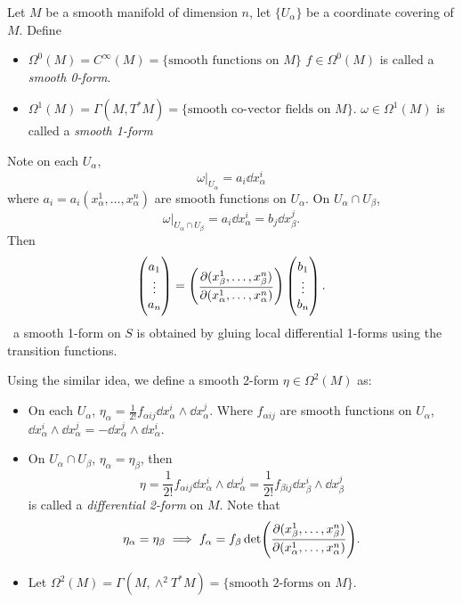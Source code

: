 Let \(M\) be a smooth manifold of dimension \(n\), let \(\{U_\alpha\}\) be a coordinate covering of \(M\). Define
\begin{itemize}
\item \(\Omega^0(M)=C^\infty(M)=\{\text{smooth functions on }M\}\)
    \(f\in \Omega^0(M)\) is called a \emph{smooth 0-form}.
\item \(\Omega^1(M)=\Gamma(M,T^*M)=\{\text{smooth co-vector fields on }M\}\).
    \(\omega\in \Omega^1(M)\) is called a \emph{smooth 1-form}
\end{itemize}

Note on each \(U_\alpha\), \[
    \omega\big|_{U_\alpha}=a_i\dd{x_\alpha^i}
\] where \(a_i=a_i(x_\alpha^1,\ldots,x_\alpha^n)\) are smooth functions on
\(U_\alpha\). On \(U_\alpha\cap U_\beta\), \[
    \omega\big|_{U_\alpha\cap U_\beta}=a_i\dd{x_\alpha^i}=b_j\dd{x_\beta^j}
.\] Then \[
    \begin{pmatrix}
        a_1 \\ \vdots \\ a_n
    \end{pmatrix}=\begin{pmatrix}
        \displaystyle\pdv{(x_\beta^1,\ldots,x_\beta^n)}{(x_\alpha^1,\ldots,x_\alpha^n)}
    \end{pmatrix}\begin{pmatrix}
        b_1 \\ \vdots \\ b_n
    \end{pmatrix}
.\] \ie\ a smooth 1-form on \(S\) is obtained by gluing local differential 1-forms
using the transition functions.

Using the similar idea, we define a smooth 2-form \(\eta\in \Omega^2(M)\) as:
\begin{itemize}
\item On each \(U_\alpha\), \(\eta_\alpha=\frac{1}{2!}f_{\alpha ij}\dd{x_\alpha^i}
    \wedge \dd{x_\alpha^j}\). Where \(f_{\alpha ij}\) are smooth functions on
    \(U_\alpha\), \(\dd{x_\alpha^i}\wedge \dd{x_\alpha^j}=-\dd{x_\alpha^j}\wedge 
    \dd{x_\alpha^i}\).
\item On \(U_\alpha\cap U_\beta\), \(\eta_\alpha=\eta_\beta\), then \[
        \eta=\frac{1}{2!}f_{\alpha ij}\dd{x_\alpha^i}\wedge \dd{x_\alpha^j}
        =\frac{1}{2!}f_{\beta ij}\dd{x_\beta^i}\wedge \dd{x_\beta^j}
    \] is called a \emph{differential 2-form} on \(M\). Note that \[
        \eta_\alpha=\eta_\beta\implies 
        f_\alpha=f_\beta \det(\pdv{(x_\beta^1,\ldots,x_\beta^n)}
        {(x_\alpha^1,\ldots,x_\alpha^n)})
    .\] 
\item Let \(\Omega^2(M)=\Gamma(M,\wedge^2T^*M)=\{\text{smooth 2-forms on }M\}\).
\end{itemize}

